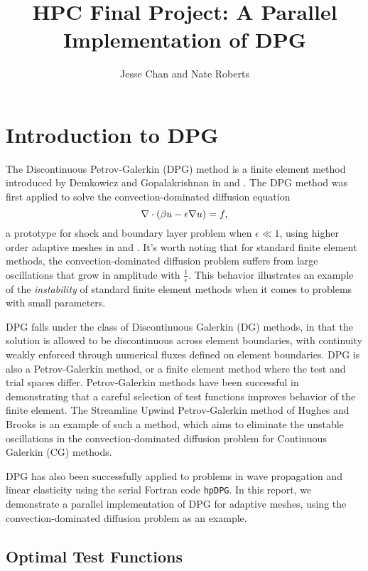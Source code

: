 \documentclass{article}
\date{}
\author{Jesse Chan and Nate Roberts}
\title{HPC Final Project: A Parallel Implementation of DPG}
\begin{document}
\maketitle

\section{Introduction to DPG}

The Discontinuous Petrov-Galerkin (DPG) method is a finite element method introduced by Demkowicz and Gopalakrishnan in \cite{DPG1} and \cite{DPG2}. The DPG method was first applied to solve the convection-dominated diffusion equation
\[
\div \left(\beta u - \epsilon\grad u\right) = f,
\]
a prototype for shock and boundary layer problem when $\epsilon \ll 1$, using higher order adaptive meshes in \cite{DPG2} and \cite{DPG3}. It's worth noting that for standard finite element methods, the convection-dominated diffusion problem suffers from large oscillations that grow in amplitude with $\frac{1}{\epsilon}$. This behavior illustrates an example of the \emph{instability} of standard finite element methods when it comes to problems with small parameters.
 
DPG falls under the class of Discontinuous Galerkin (DG) methods, in that the solution is allowed to be discontinuous across element boundaries, with continuity weakly enforced through numerical fluxes defined on element boundaries. DPG is also a Petrov-Galerkin method, or a finite element method where the test and trial spaces differ. Petrov-Galerkin methods have been successful in demonstrating that a careful selection of test functions improves behavior of the finite element. The Streamline Upwind Petrov-Galerkin method of Hughes and Brooks \cite{SUPG} is an example of such a method, which aims to eliminate the unstable oscillations in the convection-dominated diffusion problem for Continuous Galerkin (CG) methods. 

DPG has also been successfully applied to problems in wave propagation and linear elasticity \cite{DPG4}\cite{DPGElas} using the serial Fortran code \verb+hpDPG+. In this report, we demonstrate a parallel implementation of DPG for adaptive meshes, using the convection-dominated diffusion problem as an example. 

\subsection{Optimal Test Functions}
\end{document}
